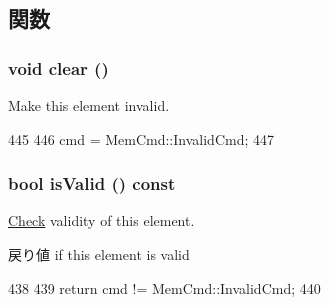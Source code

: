 \subsection{関数}
\hypertarget{structTraceGen_1_1TraceElement_ac8bb3912a3ce86b15842e79d0b421204}{
\subsubsection[{clear}]{\setlength{\rightskip}{0pt plus 5cm}void clear ()}}
\label{structTraceGen_1_1TraceElement_ac8bb3912a3ce86b15842e79d0b421204}
Make this element invalid. 


\begin{DoxyCode}
445                      {
446             cmd = MemCmd::InvalidCmd;
447         }
\end{DoxyCode}
\hypertarget{structTraceGen_1_1TraceElement_aac1b70a2ed67ead038c4d3f5ac4d8a81}{
\subsubsection[{isValid}]{\setlength{\rightskip}{0pt plus 5cm}bool isValid () const}}
\label{structTraceGen_1_1TraceElement_aac1b70a2ed67ead038c4d3f5ac4d8a81}
\hyperlink{classCheck}{Check} validity of this element.

\begin{DoxyReturn}{戻り値}
if this element is valid 
\end{DoxyReturn}



\begin{DoxyCode}
438                              {
439             return cmd != MemCmd::InvalidCmd;
440         }
\end{DoxyCode}



